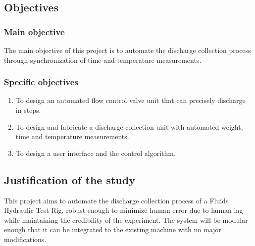 \subsection{Objectives}
\subsubsection{Main objective}

The main objective of this project is to automate the discharge collection process through synchronization of time and temperature measurements.

\subsubsection{Specific objectives}

\begin{enumerate}
	\item To design an automated flow control valve unit that can precisely discharge in steps.
	\item To design and fabricate a discharge collection unit with automated weight, time and temperature measurements.
    \item To design a user interface and the control algorithm.

\end{enumerate}


\subsection{Justification of the study}

This project aims to automate the discharge collection process of a Fluids Hydraulic Test Rig, robust enough to minimize human error due to human lag while maintaining the credibility of the experiment. The system will be modular enough that it can be integrated to the existing machine with no major modifications.